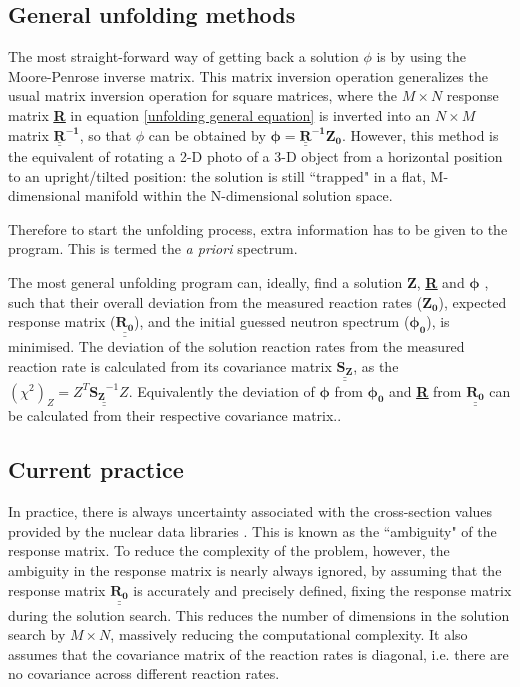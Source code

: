 \documentclass[a4paper, 12pt]{article}
\newcommand{\matr}[1]{\underline{\underline{\textbf{#1}}}}
\newcommand{\ve}[1]{\boldsymbol{#1}}
\begin{document}
\subsection{General unfolding methods} \label{general methods}
The most straight-forward way of getting back a solution $\phi$ is by using the Moore-Penrose inverse matrix. This matrix inversion operation generalizes the usual matrix inversion operation for square matrices, where the $M\times N$ response matrix \matr{R} in equation \ref{unfolding general equation} is inverted into an $N \times M$ matrix $\mathbf{\underline{\underline{R}}^{-1}}$, so that $\phi$ can be obtained by $\ve{\phi} = \mathbf{\underline{\underline{R}}^{-1}} \ve{Z_0}$. However, this method is the equivalent of rotating a 2-D photo of a 3-D object from a horizontal position to an upright/tilted position: the solution is still ``trapped" in a flat, M-dimensional manifold within the N-dimensional solution space.

Therefore to start the unfolding process, extra information has to be given to the program. This is termed the \emph{a priori} spectrum.

The most general unfolding program can, ideally, find a solution $\ve{Z}$, \matr{R} and $\ve{\phi}$ \cite{theorypdf}, such that their overall deviation from the measured reaction rates ($\ve{Z_0}$), expected response matrix ($\underline{\underline{\mathbf{R_0}}}$), and the initial guessed neutron spectrum ($\ve{\phi_0}$), is minimised. The deviation of the solution reaction rates from the measured reaction rate is calculated from its covariance matrix $\underline{\underline{\mathbf{S_Z}}}$, as the $(\chi^2)_Z = Z^T \underline{\underline{\mathbf{S_Z}^{-1}}} Z$. Equivalently the deviation of $\ve{\phi}$ from $\ve{\phi_0}$ and \matr{R} from $\underline{\underline{\mathbf{R_0}}}$ can be calculated from their respective covariance matrix..

\subsection{Current practice}
In practice, there is always uncertainty associated with the cross-section values provided by the nuclear data libraries \cite{fluence_rate_correction_factors}. This is known as the ``ambiguity" of the response matrix. To reduce the complexity of the problem, however, the ambiguity in the response matrix is nearly always ignored, by assuming that the response matrix $\underline{\underline{\mathbf{R_0}}}$ is accurately and precisely defined, fixing the response matrix during the solution search. This reduces the number of dimensions in the solution search by $M\times N$, massively reducing the computational complexity. It also assumes that the covariance matrix of the reaction rates is diagonal, i.e. there are no covariance across different reaction rates.
\end{document}
